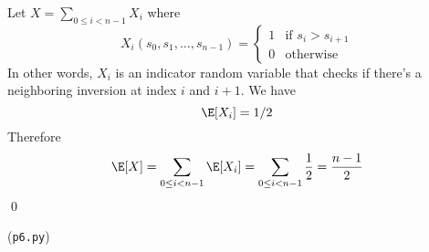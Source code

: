 

Let $X = \sum_{0 \leq i < n - 1} X_i$
where
\[
  X_i(s_0, s_1, \ldots, s_{n - 1})
  =
  \begin{cases}
    1 & \text{if } s_i > s_{i + 1}\\
    0 & \text{otherwise}
  \end{cases}
\]
In other words, $X_i$ is an indicator random variable that checks
if there's a neighboring inversion at index $i$ and $i + 1$.
We have
\[
  \E[X_i] = 1/2
\]
Therefore
\[
  \E[X]
  = \sum_{0 \leq i < n - 1} \E[X_i]
  = \sum_{0 \leq i < n - 1} \frac{1}{2}
  = \frac{n - 1}{2}
\]
\qed

(\verb!p6.py!)

    
